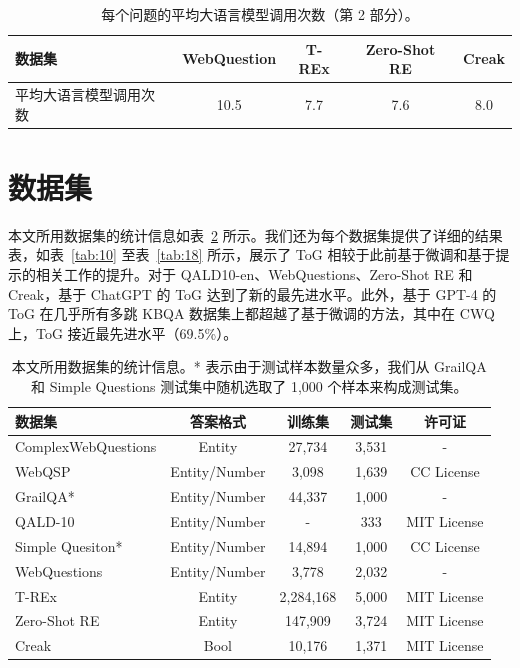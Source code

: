 \documentclass[11pt,UTF8,fontset=fandol]{ctexart}
\begin{document}
\begin{table}[H]\centering
\caption{每个问题的平均大语言模型调用次数（第 2 部分）。}
\label{tab:8}
\small
\begin{tabular}{lcccc}
\toprule
数据集 & WebQuestion & T-REx & Zero-Shot RE & Creak \\
\midrule
平均大语言模型调用次数 & 10.5 & 7.7 & 7.6 & 8.0 \\
\bottomrule
\end{tabular}
\end{table}

\section{数据集}

本文所用数据集的统计信息如表~\ref{tab:9} 所示。我们还为每个数据集提供了详细的结果表，如表~\ref{tab:10} 至表~\ref{tab:18} 所示，展示了 ToG 相较于此前基于微调和基于提示的相关工作的提升。对于 QALD10-en、WebQuestions、Zero-Shot RE 和 Creak，基于 ChatGPT 的 ToG 达到了新的最先进水平。此外，基于 GPT-4 的 ToG 在几乎所有多跳 KBQA 数据集上都超越了基于微调的方法，其中在 CWQ 上，ToG 接近最先进水平（69.5\%）。

\begin{table}[H]\centering
\caption{本文所用数据集的统计信息。* 表示由于测试样本数量众多，我们从 GrailQA 和 Simple Questions 测试集中随机选取了 1{,}000 个样本来构成测试集。}
\label{tab:9}
\small
\begin{tabular}{lcccc}
\toprule
数据集 & 答案格式 & 训练集 & 测试集 & 许可证 \\
\midrule
ComplexWebQuestions & Entity & 27,734 & 3,531 & - \\
WebQSP & Entity/Number & 3,098 & 1,639 & CC License \\
GrailQA* & Entity/Number & 44,337 & 1,000 & - \\
QALD-10 & Entity/Number & - & 333 & MIT License \\
Simple Quesiton* & Entity/Number & 14,894 & 1,000 & CC License \\
WebQuestions & Entity/Number & 3,778 & 2,032 & - \\
T-REx & Entity & 2,284,168 & 5,000 & MIT License \\
Zero-Shot RE & Entity & 147,909 & 3,724 & MIT License \\
Creak & Bool & 10,176 & 1,371 & MIT License \\
\bottomrule
\end{tabular}
\end{table}
\end{document}
